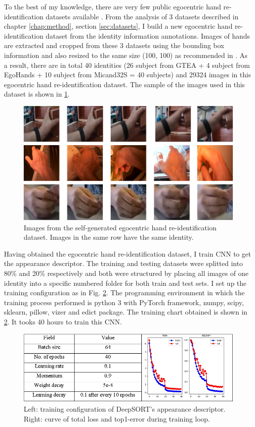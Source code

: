 To the best of my knowledge, there are very few public egocentric hand re-identification datasets available \cite{9064606}. From the analysis of 3 datasets described in chapter \ref{chap:method}, section \ref{sec:datasets}, I build a new egocentric hand re-identification dataset from the identity information annotations. Images of hands are extracted and cropped from these 3 datasets using the bounding box information and also resized to the same size (100, 100) as recommended in \cite{DBLP:journals/corr/abs-1812-00442}. As a result, there are in total 40 identities (26 subject from GTEA + 4 subject from EgoHands + 10 subject from Micand32S = 40 subjects) and 29324 images in this egocentric hand re-identification dataset. The sample of the images used in this dataset is shown in \ref{fig:reid}.
\begin{figure}[!htb]
	\centerline{\includegraphics[width=1\linewidth]{Figs/reid.png}}
	\caption{Images from the self-generated egocentric hand re-identification dataset. Images in the same row have the same identity.}
	\label{fig:reid}
\end{figure}
Having obtained the egocentric hand re-identification dataset, I train CNN to get the appearance descriptor. The training and testing datasets were splitted into 80\% and 20\% respectively and both were structured by placing all images of one identity into a specific numbered folder for both train and test sets. I set up the training configuration as in Fig. \ref{fig:descriptor}. The programming environment in which the training process performed is python 3 with PyTorch framework, numpy, scipy, sklearn, pillow, vizer and edict package.
The training chart obtained is shown in \ref{fig:descriptor}. It tooks 40 hours to train this CNN.
\begin{figure}[!htb]
	\centering
	\includegraphics[width=\linewidth]{Figs/training_descriptor.png}
	\caption{Left: training configuration of DeepSORT’s appearance descriptor. Right: curve of total loss and top1-error during training loop.}
	\label{fig:descriptor}
\end{figure}
